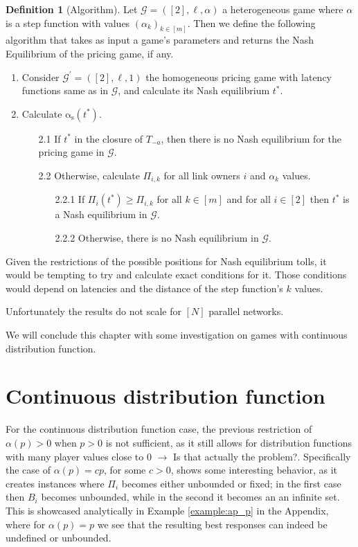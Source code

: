 \documentclass[10pt,a4paper]{book}
\newcommand{\as}{\mathrm{\alpha_s}}
\newcommand{\Gm}{\mathcal{G}}
\theoremstyle{definition}
\newtheorem{definition}{Definition}[chapter]
\theoremstyle{comment}
\begin{document}
\begin{definition}[Algorithm]
	Let $\Gm = ([2], \ell, \alpha)$ a heterogeneous game where $\alpha$ is a step function with values $(\alpha_k)_{k \in [m]}$.
	Then we define the following algorithm that takes as input a game's parameters and returns the Nash Equilibrium of the pricing game, if any.
	\begin{enumerate}
		\item Consider $\Gm^\prime = ([2], \ell, 1)$ the homogeneous pricing game with latency functions same as in $\Gm$, and calculate its Nash equilibrium $t^*$.
		\item Calculate $\as(t^*)$.
		\begin{enumerate}
			\item[2.1] If $t^*$ in the closure of $T_{-a}$, then there is no Nash equilibrium for the pricing game in $\Gm$.
			\item[2.2] Otherwise, calculate $\Pi_{i, k}$ for all link owners $i$ and $\alpha_k$ values.
			\begin{enumerate}
				\item[2.2.1] If $\Pi_i(t^*) \ge \Pi_{i, k}$ for all $k \in [m]$ and for all $i \in [2]$ then $t^*$ is a Nash equilibrium in $\Gm$.
				\item[2.2.2] Otherwise, there is no Nash equilibrium in $\Gm$.
			\end{enumerate}
		\end{enumerate}
	\end{enumerate}
\end{definition}

Given the restrictions of the possible positions for Nash equilibrium tolls, it would be tempting to try and calculate exact conditions for it.
Those conditions would depend on latencies and the distance of the step function's $k$ values.

Unfortunately the results do not scale for $[N]$ parallel networks.

We will conclude this chapter with some investigation on games with continuous distribution function.

\section{Continuous distribution function}

For the continuous distribution function case, the previous restriction of $\alpha(p) > 0$ when $p > 0$ is not sufficient, as it still allows for distribution functions with many player values close to $0$ $\rightarrow$ Is that actually the problem?.
Specifically the case of $\alpha(p) = cp$, for some $c > 0$, shows some interesting behavior, as it creates instances where $\Pi_i$ becomes either unbounded or fixed; in the first case then $B_i$ becomes unbounded, while in the second it becomes an an infinite set.
This is showcased analytically in Example \ref{example:ap_p} in the Appendix, where for $\alpha(p) = p$ we see that the resulting best responses can indeed be undefined or unbounded.
\end{document}

